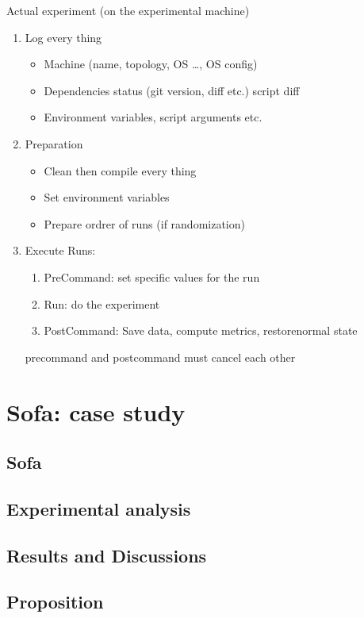 Actual experiment (on the experimental machine)
\begin{enumerate}
    \item Log every thing
        \begin{itemize}
            \item Machine (name, topology, OS \ldots, OS
                config)
            \item Dependencies status (git version, diff etc.)
                script diff
            \item Environment variables, script arguments etc.
        \end{itemize}
    \item Preparation
        \begin{itemize}
            \item Clean then compile every thing
            \item Set environment variables
            \item Prepare ordrer of runs (if randomization)
        \end{itemize}
    \item Execute Runs:
        \begin{enumerate}
            \item PreCommand: set specific values for the run
            \item Run: do the experiment
            \item PostCommand: Save data, compute metrics,
                restorenormal state
        \end{enumerate}
        precommand and postcommand must cancel each other
\end{enumerate}


\section{Sofa: case study}

\subsection{Sofa}


\subsection{Experimental analysis}


\subsection{Results and Discussions}



\subsection{Proposition}

